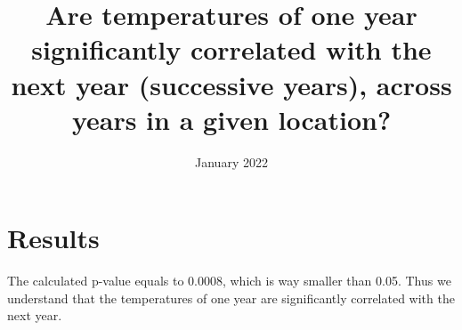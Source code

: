 \documentclass{article}
\title{Are temperatures of one year significantly correlated with the next year (successive years), across years in a given location?}
\date{January 2022}
\begin{document}
\maketitle

\section{Results}
The calculated p-value equals to 0.0008, which is way smaller than 0.05. Thus we understand that the temperatures of one year are significantly correlated with the next year.
\end{document}
